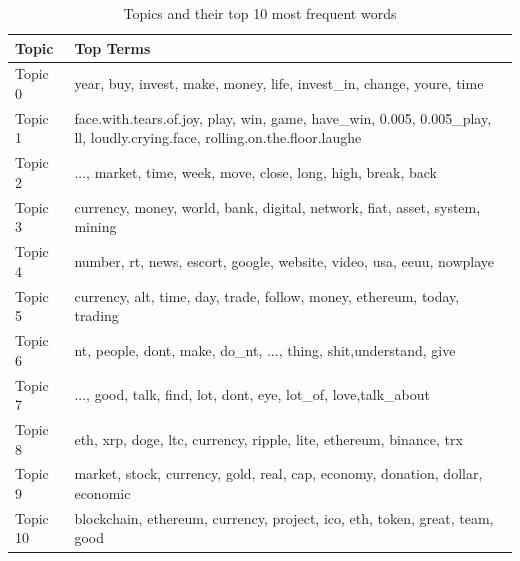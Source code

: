 \documentclass[
]{article}
\begin{document}
\begin{table}

\caption{\label{tab:topictable}Topics and their top 10 most frequent words}
\centering
\begin{tabular}[t]{l|l}
\hline
Topic & Top Terms\\
\hline
Topic 0 & year,             buy,          invest,            make,           money,            life,       invest\_in,          change,           youre,            time\\
\hline
Topic 1 & face.with.tears.of.joy,                                         play,                                          win,                                         game,                                     have\_win,                                        0.005,                                   0.005\_play,                                           ll,                           loudly.crying.face,                  rolling.on.the.floor.laughe\\
\hline
Topic 2 & ..., market,   time,   week,   move,  close,   long,   high,  break,   back\\
\hline
Topic 3 & currency,      money,      world,       bank,    digital,    network,       fiat,      asset,     system,     mining\\
\hline
Topic 4 & number,                          rt,                        news,                      escort,                      google,                     website,                       video,                         usa,                        eeuu,                    nowplaye\\
\hline
Topic 5 & currency,       alt,      time,       day,     trade,    follow,     money,  ethereum,     today,   trading\\
\hline
Topic 6 & nt,    people,      dont,      make,     do\_nt,       ...,     thing,      shit,understand,      give\\
\hline
Topic 7 & ...,      good,      talk,      find,       lot,      dont,       eye,    lot\_of,      love,talk\_about\\
\hline
Topic 8 & eth,      xrp,     doge,      ltc, currency,   ripple,     lite, ethereum,  binance,      trx\\
\hline
Topic 9 & market,            stock,         currency,             gold,             real,              cap,          economy,         donation,           dollar,         economic\\
\hline
Topic 10 & blockchain,  ethereum,  currency,   project,       ico,       eth,     token,     great,      team,      good\\

\end{tabular}
\end{table}
\end{document}
